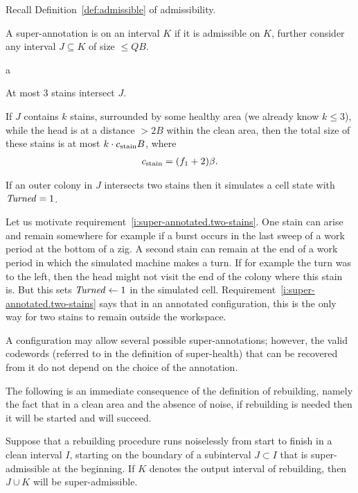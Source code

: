 \documentclass[11pt]{memoir}
\theoremstyle{definition} %
\renewcommand{\le}{\leq}
\newcommand{\fld}[1]{\ensuremath{\textit{#1\/}}}
\def\B{B}
\newcommand{\f}{f}
\newcommand{\Q}{Q}
\newcommand{\Turned}{\fld{Turned}}
\newcommand{\cns}[1]{c_{\textrm{\upshape #1}}}
\begin{document}
Recall Definition~\ref{def:admissible} of admissibility.
  \begin{definition}\label{def:super-admissible}
A super-annotation is  on an interval \( K \) if it is admissible on \( K \),
further consider any interval \( J\subseteq K\) of size \( \le\Q\B \).
\begin{varenum}[resume=admissible]{a}
\item At most 3 stains intersect \( J \).
\item If \( J \) contains \( k \) stains, surrounded by some healthy area
(we already know \( k\le 3 \)), while the head is at a distance \( >2\B \) within the clean area,
then the total size of these stains is at most \( k\cdot\cns{stain}\B \), where
\begin{align}\label{eq:stain}
   \cns{stain} = (\f_{1}+2)\beta.
 \end{align}
\item\label{i:super-annotated.two-stains} If an outer colony in \( J \)
  intersects two stains then it simulates 
  a cell state with \( \Turned=1 \).
\end{varenum}
\end{definition}

Let us motivate requirement~\eqref{i:super-annotated.two-stains}.  
One stain can arise and remain somewhere for example if a burst occurs in the
last sweep of a work period at the bottom of a zig.
A second stain can remain at the end of a work period in which the simulated
machine makes a turn.
If for example the turn was to the left, then the head might not visit the end of the colony
where this stain is.
But this sets \( \Turned\gets 1 \) in the simulated cell.
Requirement~\eqref{i:super-annotated.two-stains} says that in an annotated
configuration, this is the only way for two stains to remain outside the
workspace.

A configuration may allow several possible super-annotations;
however, the valid codewords (referred to in the definition
of super-health) that can be recovered from it do not depend on the choice of the
annotation.

The following is an immediate consequence of the definition of rebuilding, namely the fact that
in a clean area and the absence of noise, if rebuilding is needed then it will be started and will succeed.

\begin{lemma}\label{lem:rebuild-health}
Suppose that a rebuilding procedure runs noiselessly from start to finish in a clean interval \( I \),
starting on the boundary of a subinterval \( J\subset I \) that is super-admissible at the beginning.
If \( K \) denotes the output interval of rebuilding, then \( J\cup K \) will be super-admissible.
\end{lemma}
\end{document}
